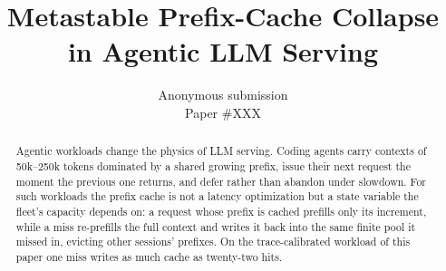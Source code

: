 \documentclass[letterpaper,twocolumn,10pt]{article}
\begin{document}
\date{}

\title{\Large \bf Metastable Prefix-Cache Collapse in Agentic LLM Serving}

\author{
{\rm Anonymous submission}\\
Paper \#XXX
}

\maketitle

\begin{abstract}
Agentic workloads change the physics of LLM serving. Coding agents
carry contexts of 50k--250k tokens dominated by a shared growing
prefix, issue their next request the moment the previous one returns,
and defer rather than abandon under slowdown. For such workloads the
prefix cache is not a latency optimization but a state variable the
fleet's capacity depends on: a request whose prefix is cached
prefills only its increment, while a miss re-prefills the full
context and writes it back into the same finite pool it missed in,
evicting other sessions' prefixes. On the trace-calibrated workload
of this paper one miss writes as much cache as twenty-two hits.


\end{abstract}
\end{document}
